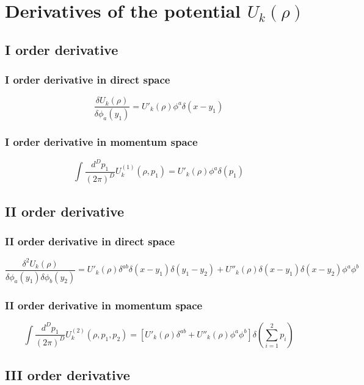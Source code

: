 \section{Derivatives of the potential $U_k(\rho)$}
\subsection{I order derivative}
\subsubsection{I order derivative in direct space}
\begin{equation}
 \frac{\delta U_k(\rho)}{\delta \phi_a(y_1)} = U'_k(\rho)\phi^a\delta(x - y_1)
\end{equation}
\subsubsection{I order derivative in momentum space}
\begin{equation}\label{U1}
 \int  \frac{d^Dp_1}{(2\pi)^D} U_k^{(1)}(\rho, p_1) = U'_k(\rho)\phi^a\delta(p_1)
\end{equation}
\subsection{II order derivative}
\subsubsection{II order derivative in direct space}
\begin{equation}
 \frac{\delta^2 U_k(\rho)}{\delta \phi_a(y_1)\delta \phi_b(y_2)} = U'_k(\rho)\delta^{ab}\delta(x - y_1)\delta(y_1 - y_2) + U''_k(\rho)\delta(x-y_1)\delta(x-y_2) {\phi}^a{\phi}^b
\end{equation}
\subsubsection{II order derivative in momentum space}
\begin{equation}\label{U2}
\int  \frac{d^Dp_1}{(2\pi)^D} U_k^{(2)}(\rho, p_1, p_2) = \left[U'_k(\rho)\delta^{ab} + U''_k(\rho){\phi}^a{\phi}^b\right]\delta\left(\sum_{i = 1}^2 p_i \right) 
\end{equation}
\subsection{III order derivative}
